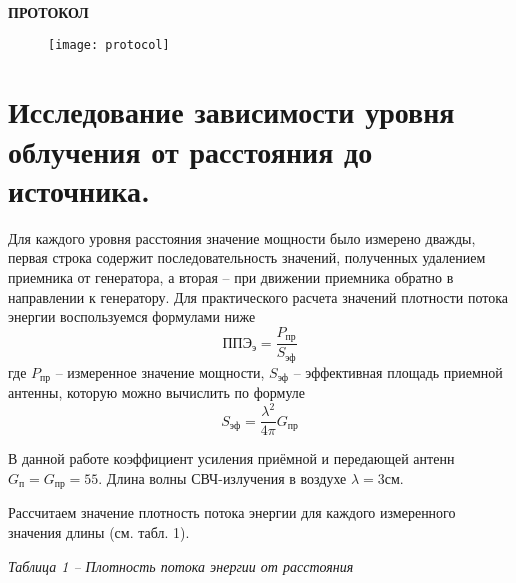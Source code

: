 \setcounter{page}{2}
\begin{center}
    \textbf{ПРОТОКОЛ}
\end{center}
\begin{figure}[H]
    \centering
    \texttt{[image: protocol]}
    \label{fig:protocol}
\end{figure}
\pagebreak
\section*{Исследование зависимости уровня облучения от расстояния до источника.}

Для каждого уровня расстояния значение мощности было измерено дважды, первая строка
содержит последовательность значений, полученных удалением приемника от генератора, а вторая --
при движении приемника обратно в направлении к генератору.
Для практического расчета значений плотности потока энергии воспользуемся формулами ниже
\begin{displaymath}
    \text{ППЭ}_\text{э} = \frac{P_{\text{пр}}}{S_{\text{эф}}}
\end{displaymath}
где $P_{\text{пр}}$ -- измеренное значение мощности, $S_{\text{эф}}$ -- эффективная площадь
приемной антенны, которую можно вычислить по формуле
\begin{displaymath}
    S_{\text{эф}} = \frac{\lambda^2}{4\pi} G_{\text{пр}}
\end{displaymath}

В данной работе коэффициент усиления приёмной и передающей антенн $G_{\text{п}} = G_{\text{пр}} = 55$.
Длина волны СВЧ-излучения в воздухе $\lambda = 3 \text{см}$.

Рассчитаем значение плотность потока энергии для каждого измеренного значения длины (см. табл. 1).

\vspace{0.4cm}
\noindent\textit{Таблица 1 -- Плотность потока энергии от расстояния}

